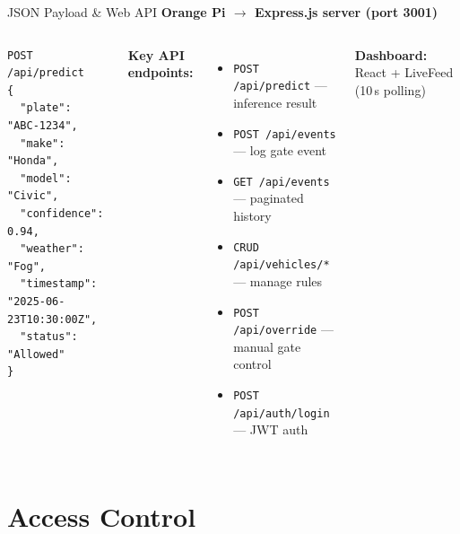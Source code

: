 \documentclass[aspectratio=169,11pt]{beamer}
\begin{document}
\begin{frame}[fragile]{JSON Payload \& Web API}
  \textbf{Orange Pi $\rightarrow$ Express.js server (port 3001)}
  \vspace{0.3em}
  \begin{columns}[T]
    \begin{lstlisting}
POST /api/predict
{
  "plate": "ABC-1234",
  "make": "Honda",
  "model": "Civic",
  "confidence": 0.94,
  "weather": "Fog",
  "timestamp": "2025-06-23T10:30:00Z",
  "status": "Allowed"
}
    \end{lstlisting}
    \textbf{Key API endpoints:}
    \begin{itemize}
      \item \texttt{POST /api/predict} --- inference result
      \item \texttt{POST /api/events} --- log gate event
      \item \texttt{GET /api/events} --- paginated history
      \item \texttt{CRUD /api/vehicles/*} --- manage rules
      \item \texttt{POST /api/override} --- manual gate control
      \item \texttt{POST /api/auth/login} --- JWT auth
    \end{itemize}
    \textbf{Dashboard:} React + LiveFeed (10\,s polling)
  \end{columns}
\end{frame}

\section{Access Control}
\end{document}
